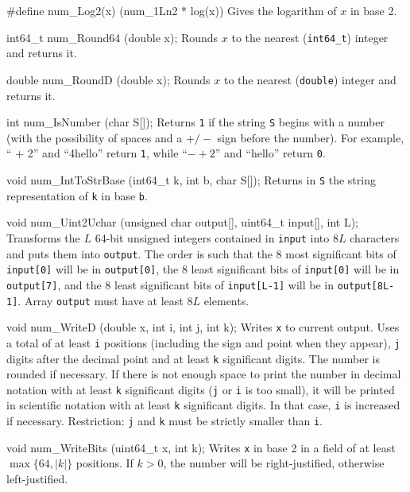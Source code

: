 #define num_Log2(x) (num_1Ln2 * log(x)) 
\endcode
  \tab Gives the logarithm of $x$ in base 2.
  \endtab
\code


int64_t num_Round64 (double x);
\endcode
  \tab Rounds $x$ to the nearest ({\tt int64\_t}) integer and returns it.
  \endtab
\code


double num_RoundD (double x);
\endcode
  \tab Rounds $x$ to the nearest ({\tt double}) integer and returns it.
  \endtab
\code


int num_IsNumber (char S[]);
\endcode 
\tab  Returns {\tt 1} if the string {\tt S} begins with a number     
   (with the possibility of spaces and a $+/-$ sign    
   before the number). For example, `` + 2'' and ``4hello''
   return {\tt 1}, while ``$-+2$'' and ``hello'' return  {\tt 0}.
\endtab
\code


void num_IntToStrBase (int64_t k, int b, char S[]);
\endcode
  \tab Returns in {\tt S} the string representation of {\tt k} in base {\tt b}.
  \endtab
\code


void num_Uint2Uchar (unsigned char output[], uint64_t input[], int L);
\endcode
  \tab Transforms the $L$ 64-bit unsigned integers contained in {\tt input} into
  $8L$ characters and puts them into {\tt output}. The order is such that 
  the 8 most significant bits of {\tt input[0]} will be in {\tt output[0]},
  the 8 least significant bits of {\tt input[0]} will be in {\tt output[7]},
  and the 8 least significant bits of {\tt input[L-1]} will be in
  {\tt output[8L-1]}. Array {\tt output} must have at least $8L$ elements.
  \endtab
\code


void num_WriteD (double x, int i, int j, int k);
\endcode
  \tab  Writes {\tt x} to current output.  Uses a total of at least {\tt i}
   positions (including the sign and point when they appear),
   {\tt j} digits after the decimal point and at least {\tt k}
   significant digits.   The number is rounded if necessary.
   If there is not enough space to print the number in decimal notation
   with at least {\tt k} significant digits
   ({\tt j} or {\tt i} is too small), it will be printed in scientific
   notation with at least {\tt k} significant digits.
   In that case, {\tt i} is increased if necessary. 
   Restriction: {\tt j} and {\tt k} must be strictly smaller than {\tt i}.
 \endtab
\code

void num_WriteBits (uint64_t x, int k);
\endcode
 \tab Writes {\tt x} in base 2 in a field of at least $\max\{64, |k|\}$ positions.
  If $k>0$, the number will be right-justified, otherwise left-justified.
 \endtab
\code

